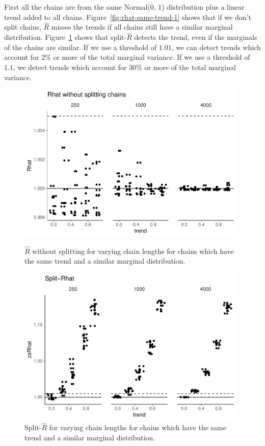 \documentclass[american,]{article}
\begin{document}
First all the chains are from the same Normal(0, 1) distribution plus
a linear trend added to all chains. Figure~\ref{fig:rhat-same-trend-1}
shows that if we don't split chains, \(\widehat{R}\) misses the trends
if all chains still have a similar marginal distribution.
%
Figure~\ref{fig:zsrhat-same-trend-1} shows that split-\(\widehat{R}\)
detects the trend, even if the marginals of the chains are similar. If
we use a threshold of \(1.01\), we can detect trends which account for
2\% or more of the total marginal variance. If we use a threshold of
\(1.1\), we detect trends which account for 30\% or more of the total
marginal variance.
\begin{figure}[tp]
  \centering
  \begin{minipage}{0.48\textwidth}
  \includegraphics[width=0.98\textwidth]{graphics/rhat-same-trend-1.pdf}
  \caption{\(\widehat{R}\) without splitting for varying chain lengths
    for chains which have the same trend and a similar marginal
    distribution.}
  \label{fig:rhat-same-trend-1}
\end{minipage}
\hfill
  \begin{minipage}{0.48\textwidth}
  \includegraphics[width=0.98\textwidth]{graphics/zsrhat-same-trend-1.pdf}
  \caption{Split-\(\widehat{R}\) for varying chain lengths
    for chains which have the same trend and a similar marginal
    distribution.}
  \label{fig:zsrhat-same-trend-1}
\end{minipage}
\end{figure}
\end{document}
